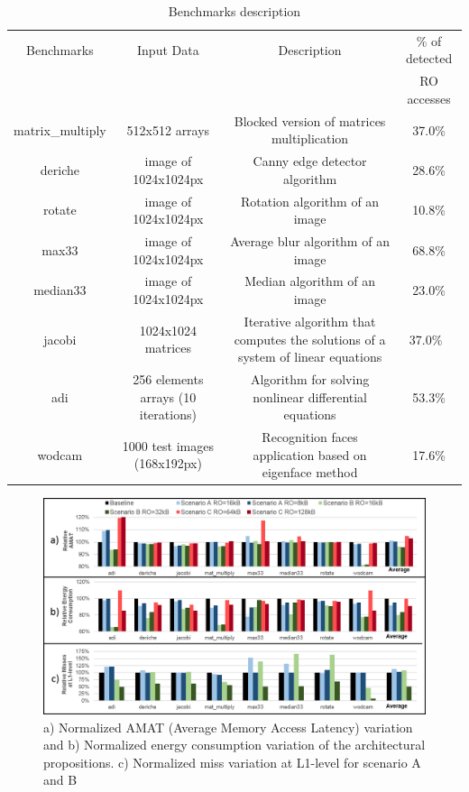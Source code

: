 \documentclass[sigconf]{acmart}
\begin{document}
\begin{table}
\centering
\caption{Benchmarks description}
\label{benchs}
\begin{tabular}{ |c|c|c|c| }
\hline
\hline
  Benchmarks &  Input Data & Description &  \% of detected  \\
   &  &  &RO accesses \\
\hline
 matrix\_multiply & 512x512 arrays&  Blocked version of matrices multiplication& 37.0\%\\ 
\hline
 deriche & image of 1024x1024px& Canny edge detector algorithm& 28.6\%\\
\hline
 rotate & image of 1024x1024px &  Rotation algorithm of an image & 10.8\%\\
\hline
 max33 &  image of 1024x1024px & Average blur algorithm of an image& 68.8\%\\
\hline
 median33 &  image of 1024x1024px& Median algorithm of an image& 23.0\%\\
\hline
 jacobi & 1024x1024 matrices  &Iterative algorithm that computes the solutions of a system of linear equations & 37.0\%\ \\
\hline
 adi & 256 elements arrays (10 iterations) &  Algorithm for solving non\-linear differential equations & 53.3\%\\
\hline
 wodcam & 1000 test images (168x192px) &Recognition faces application based on eigenface method & 17.6\%\\
\hline
\hline
\end{tabular}
\end{table}

\begin{figure}
    \centering
    \includegraphics[width=15cm]{./images/results.png}
    \caption{a) Normalized AMAT (Average Memory Access Latency) variation and b) Normalized energy consumption variation of the architectural propositions. c) Normalized miss variation at L1-level for scenario A and B}
    \label{results}
\end{figure}
\end{document}
